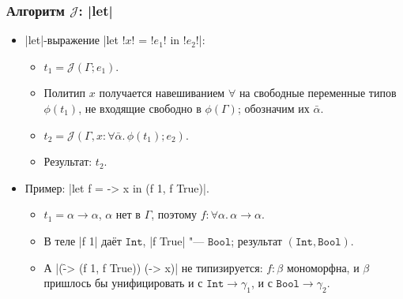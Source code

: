\documentclass[11pt]{beamer}
\newcommand{\tInt}{\mathtt{Int}}
\newcommand{\tBool}{\mathtt{Bool}}
\newcommand{\J}{\mathcal{J}}
\begin{document}
\begin{frame}[fragile]
  \frametitle{Алгоритм $\J$: \haskinline|let|}
  \begin{itemize}
    \item \haskinline|let|-выражение \haskinline|let !$x$! = !$e_1$! in !$e_2$!|:
          \begin{itemize}
            \item $t_1 = \J(\Gamma; e_1)$.
            \item Политип $x$ получается навешиванием $\forall$ на свободные переменные типов $\phi(t_1)$, не входящие свободно в $\phi(\Gamma)$; обозначим их $\bar\alpha$.
            \item $t_2 = \J(\Gamma, x : \forall\bar\alpha.\,\phi(t_1); e_2)$.
            \item Результат: \pause $t_2$.
          \end{itemize}
          \pause
    \item Пример: \haskinline|let f = \x -> x in (f 1, f True)|.
          \begin{itemize}
            \item $t_1 = \alpha \to \alpha$, $\alpha$ нет в $\Gamma$, поэтому $f : \forall\alpha.\,\alpha \to \alpha$.
                  \pause
            \item В теле \haskinline|f 1| даёт \pause $\tInt$, \haskinline|f True| "--- $\tBool$; результат \pause $(\tInt, \tBool)$.
                  \pause
            \item А \haskinline|(\f -> (f 1, f True)) (\x -> x)| \pause не типизируется: $f : \beta$ мономорфна, и $\beta$ пришлось бы унифицировать и с $\tInt \to \gamma_1$, и с $\tBool \to \gamma_2$.
          \end{itemize}
  \end{itemize}
\end{frame}
\end{document}
